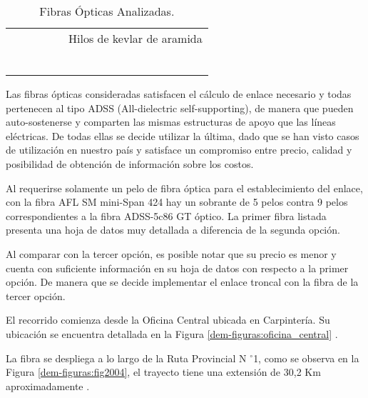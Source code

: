 \begin{table}[H]
\begin{tabular}{|c|c|c|c|c|cc|}
          &       &       &       &       & \multicolumn{2}{c|}{Hilos de kevlar de aramida} \\
          &       &       &       &       & \multicolumn{2}{c|}{} \\
          &       &       &       &       & \multicolumn{2}{c|}{} \\
          &       &       &       &       & \multicolumn{2}{c|}{} \\
          &       &       &       &       & \multicolumn{2}{c|}{} \\
          &       &       &       &       & \multicolumn{2}{c|}{} \\
          &       &       &       &       & \multicolumn{2}{c|}{} \bigstrut[b]\\
    \hline
    \end{tabular}%
  \caption{Fibras Ópticas Analizadas.}
  \label{tab:fo-analizadas}%
\end{table}%


Las fibras ópticas consideradas satisfacen el cálculo de enlace necesario y todas pertenecen al tipo ADSS (All-dielectric self-supporting), de manera que pueden auto-sostenerse y comparten las mismas estructuras de apoyo que las líneas eléctricas. De todas ellas se decide utilizar la última, dado que se han visto casos de utilización en nuestro país y satisface un compromiso entre precio, calidad y posibilidad de obtención de información sobre los costos.

Al requerirse solamente un pelo de fibra óptica para el establecimiento del enlace, con la fibra
AFL SM mini-Span 424 hay un sobrante de 5 pelos contra 9 pelos correspondientes a la fibra
ADSS-5c86 GT óptico. La primer fibra listada presenta una hoja de datos muy detallada a diferencia de la segunda opción.

Al comparar con la tercer opción, es posible notar que su precio es menor y cuenta con suficiente
información en su hoja de datos con respecto a la primer opción. De manera que se decide implementar el enlace troncal con la fibra de la tercer opción. 

El recorrido comienza desde la Oficina Central ubicada en Carpintería. Su ubicación se encuentra detallada en la Figura \ref{dem-figuras:oficina_central} . 





La fibra se despliega a lo largo de la Ruta Provincial N $^{\circ}$1, como se observa en la Figura \ref{dem-figuras:fig2004}, el trayecto tiene una extensión de 30,2 Km aproximadamente \cite{secretaria}.

